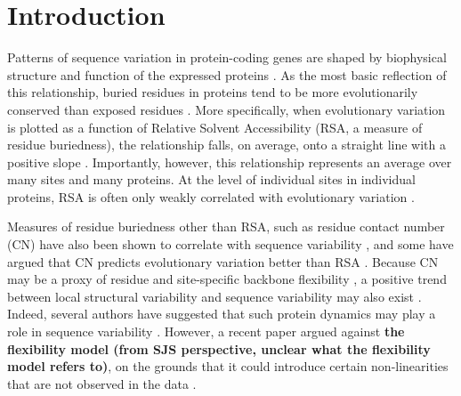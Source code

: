 \documentclass[smallextended]{svjour3}
\begin{document}
\section*{Introduction}

Patterns of sequence variation in protein-coding genes are shaped by biophysical structure and function of the expressed proteins
\citep{WilkeDrummond2010,MarshTeichmann2014}. As the most basic reflection of this relationship, buried residues in proteins tend to be more evolutionarily conserved than exposed residues
\citep{Overingtonetal1992,Goldmanetal1998,MirnyShakhnovich1999,Deanetal2002}. More specifically, when evolutionary variation is plotted as a function of Relative Solvent Accessibility (RSA, a measure of residue buriedness), the relationship falls, on average, onto a straight line with a positive slope \citep{FranzosaXia2009,Ramseyetal2011,FranzosaXia2012,Scherreretal2012}. Importantly, however, this relationship represents an average over many sites and many proteins. At the level of individual sites in individual proteins, RSA is often only weakly correlated with evolutionary variation \citep{MeyerWilke2013,Meyeretal2013,Yehetal2014}.

Measures of residue buriedness other than RSA, such as residue contact number (CN) have also been shown to correlate with sequence variability \citep{Liaoetal2005,FranzosaXia2009,Yehetal2014}, and some have argued that CN predicts evolutionary variation better than RSA \citep{Yehetal2014}. Because CN may be a proxy of residue and site-specific backbone flexibility \citep{Halle2002}, a positive trend between local structural variability and sequence variability may also exist \citep{Yehetal2014}. Indeed, several authors have suggested that such protein dynamics may play a role in sequence variability \citep{LiuBahar2012,NevinGereketal2013,MarshTeichmann2014}. However, a recent paper argued against \textbf{the flexibility model (from SJS perspective, unclear what the flexibility model refers to)}, on the grounds that it could introduce certain non-linearities that are not observed in the data \citep{Huangetal2014}.
\end{document}
